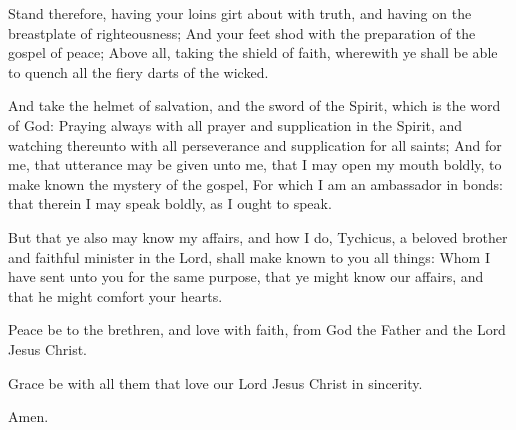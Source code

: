 \verse Stand therefore, having your loins girt about with truth, and having on the breastplate of righteousness; \verse And your feet shod with the preparation of the gospel of peace; \verse Above all, taking the shield of faith, wherewith ye shall be able to quench all the fiery darts of the wicked.

\verse And take the helmet of salvation, and the sword of the Spirit, which is the word of God: \verse Praying always with all prayer and supplication in the Spirit, and watching thereunto with all perseverance and supplication for all saints; \verse And for me, that utterance may be given unto me, that I may open my mouth boldly, to make known the mystery of the gospel, \verse For which I am an ambassador in bonds: that therein I may speak boldly, as I ought to speak.

\verse But that ye also may know my affairs, and how I do, Tychicus, a beloved brother and faithful minister in the Lord, shall make known to you all things: \verse Whom I have sent unto you for the same purpose, that ye might know our affairs, and that he might comfort your hearts.

\verse Peace be to the brethren, and love with faith, from God the Father and the Lord Jesus Christ.

\verse Grace be with all them that love our Lord Jesus Christ in sincerity.

Amen.

